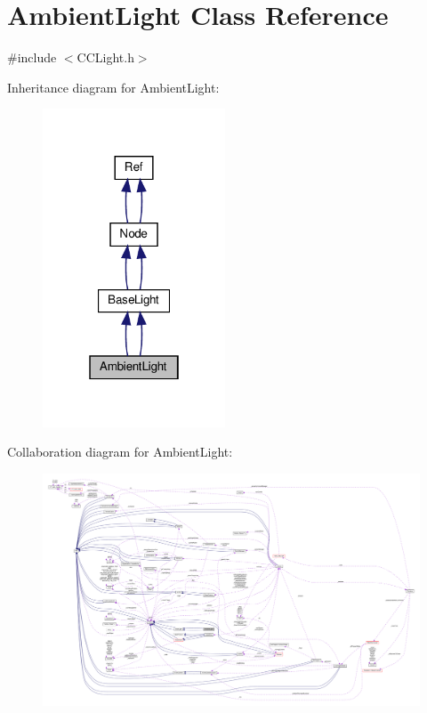\hypertarget{classAmbientLight}{}\section{Ambient\+Light Class Reference}
\label{classAmbientLight}


{\ttfamily \#include $<$C\+C\+Light.\+h$>$}



Inheritance diagram for Ambient\+Light\+:
\nopagebreak
\begin{figure}[H]
\begin{center}
\leavevmode
\includegraphics[width=154pt]{classAmbientLight__inherit__graph}
\end{center}
\end{figure}


Collaboration diagram for Ambient\+Light\+:
\nopagebreak
\begin{figure}[H]
\begin{center}
\leavevmode
\includegraphics[width=350pt]{classAmbientLight__coll__graph}
\end{center}
\end{figure}
